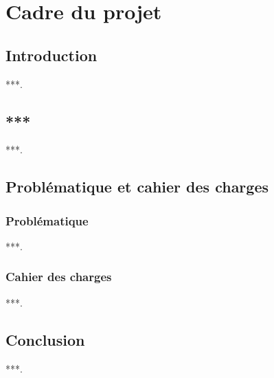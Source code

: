 \chapter{Cadre du projet}\label{chap-1}

\minitoc

\newpage

\section{Introduction}
***.

\section{***}
***.

\section{Problématique et cahier des charges}

\subsection{Problématique}
***.

\subsection{Cahier des charges}
***.

\section{Conclusion}
***.
